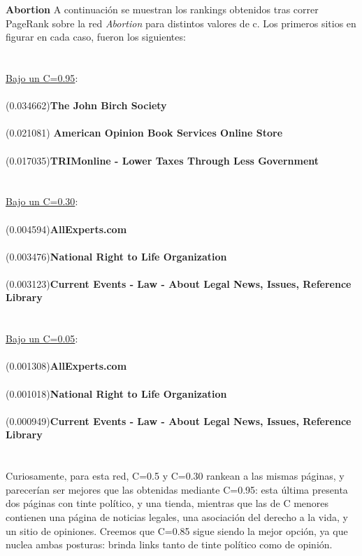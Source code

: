 \documentclass[a4paper]{article}
\begin{document}
\textbf{Abortion}
\indent A continuaci\'on se muestran los rankings obtenidos tras correr PageRank sobre la red \emph{Abortion} para distintos valores de c. Los primeros sitios en figurar en cada caso, fueron los siguientes: \\
\\
\\
\underline{Bajo un C=0.95}: \\
\\
(0.034662)\textbf{The John Birch Society}\\
\\
(0.021081) \textbf{American Opinion Book Services Online Store}\\
\\
(0.017035)\textbf{TRIMonline - Lower Taxes Through Less Government} \\
\\
\\
\underline{Bajo un C=0.30}: \\
\\
(0.004594)\textbf{AllExperts.com}\\
\\
(0.003476)\textbf{National Right to Life Organization}\\
\\
(0.003123)\textbf{Current Events - Law - About Legal News, Issues, Reference Library}\\
\\
\\
\underline{Bajo un C=0.05}: \\
\\
(0.001308)\textbf{AllExperts.com}\\
\\
(0.001018)\textbf{National Right to Life Organization}\\
\\
(0.000949)\textbf{Current Events - Law - About Legal News, Issues, Reference Library}\\
\\
\\
Curiosamente, para esta red, C=0.5 y C=0.30 rankean a las mismas páginas, y parecerían ser mejores que las obtenidas mediante C=0.95: esta última presenta dos páginas con tinte político, y una tienda, mientras que las de C menores contienen una página de noticias legales, una asociación del derecho a la vida, y un sitio de opiniones.
Creemos que C=0.85 sigue siendo la mejor opción, ya que nuclea ambas posturas: brinda links tanto de tinte político como de opinión.
\\
\end{document}

